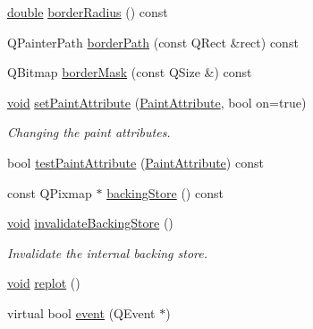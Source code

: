 \begin{DoxyCompactItemize}
\item 
\hyperlink{_super_l_u_support_8h_a8956b2b9f49bf918deed98379d159ca7}{double} \hyperlink{class_qwt_plot_canvas_a76b086055480789c4410eb114789fe2e}{border\-Radius} () const 
\item 
Q\-Painter\-Path \hyperlink{class_qwt_plot_canvas_a4a8f1deba3712b689a1b9ae1060f8c08}{border\-Path} (const Q\-Rect \&rect) const 
\item 
Q\-Bitmap \hyperlink{class_qwt_plot_canvas_a440240dca270d8216d12451a94b68f2b}{border\-Mask} (const Q\-Size \&) const 
\item 
\hyperlink{group___u_a_v_objects_plugin_ga444cf2ff3f0ecbe028adce838d373f5c}{void} \hyperlink{class_qwt_plot_canvas_a7859beb87bcef4fd53f99e7c87104e27}{set\-Paint\-Attribute} (\hyperlink{class_qwt_plot_canvas_a76066290edb594a71ee09be564563b0f}{Paint\-Attribute}, bool on=true)
\begin{DoxyCompactList}\small\item\em Changing the paint attributes. \end{DoxyCompactList}\item 
bool \hyperlink{class_qwt_plot_canvas_a804f78518b0ba72b11ba996fd2457fb1}{test\-Paint\-Attribute} (\hyperlink{class_qwt_plot_canvas_a76066290edb594a71ee09be564563b0f}{Paint\-Attribute}) const 
\item 
const Q\-Pixmap $\ast$ \hyperlink{class_qwt_plot_canvas_aa46dfe9b0d4a3a1d81ef1fca66c2093c}{backing\-Store} () const 
\item 
\hyperlink{group___u_a_v_objects_plugin_ga444cf2ff3f0ecbe028adce838d373f5c}{void} \hyperlink{class_qwt_plot_canvas_adafbfa908b2d3b6cf9c20aa6cf9abe27}{invalidate\-Backing\-Store} ()
\begin{DoxyCompactList}\small\item\em Invalidate the internal backing store. \end{DoxyCompactList}\item 
\hyperlink{group___u_a_v_objects_plugin_ga444cf2ff3f0ecbe028adce838d373f5c}{void} \hyperlink{class_qwt_plot_canvas_a1548423348c29001ee2b6fd1c0f9f033}{replot} ()
\item 
virtual bool \hyperlink{class_qwt_plot_canvas_ab7f160c99d7d408a979ebe2acae951bc}{event} (Q\-Event $\ast$)
\end{DoxyCompactItemize}
